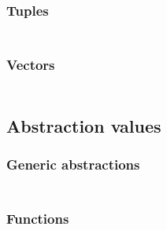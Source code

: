 \subsubsection{Tuples}\hypertarget{tuples}{}\label{tuples}

\begin{align*}
  [ \
  \KEY{Datatype} \quad & \NAMEHYPER{../../../../../Funcons-beta/Values/Composite}{Tuples}{tuples}
  \ ]
\end{align*}
\subsubsection{Vectors}\hypertarget{vectors}{}\label{vectors}

\begin{align*}
  [ \
  \KEY{Datatype} \quad & \NAMEHYPER{../../../../../Funcons-beta/Values/Composite}{Vectors}{vectors} \\
  \KEY{Funcon} \quad & \NAMEHYPER{../../../../../Funcons-beta/Values/Composite}{Vectors}{vector} \\
  \KEY{Funcon} \quad & \NAMEHYPER{../../../../../Funcons-beta/Values/Composite}{Vectors}{vector-elements}
  \ ]
\end{align*}
\subsection{Abstraction values}\hypertarget{abstraction-values}{}\label{abstraction-values}

\subsubsection{Generic abstractions}\hypertarget{generic-abstractions}{}\label{generic-abstractions}

\begin{align*}
  [ \
  \KEY{Funcon} \quad & \NAMEHYPER{../../../../../Funcons-beta/Values/Abstraction}{Generic}{closure}
  \ ]
\end{align*}
\subsubsection{Functions}\hypertarget{functions}{}\label{functions}

\begin{align*}
  [ \
  \KEY{Datatype} \quad & \NAMEHYPER{../../../../../Funcons-beta/Values/Abstraction}{Functions}{functions} \\
  \KEY{Funcon} \quad & \NAMEHYPER{../../../../../Funcons-beta/Values/Abstraction}{Functions}{function} \\
  \KEY{Funcon} \quad & \NAMEHYPER{../../../../../Funcons-beta/Values/Abstraction}{Functions}{apply}
  \ ]
\end{align*}
